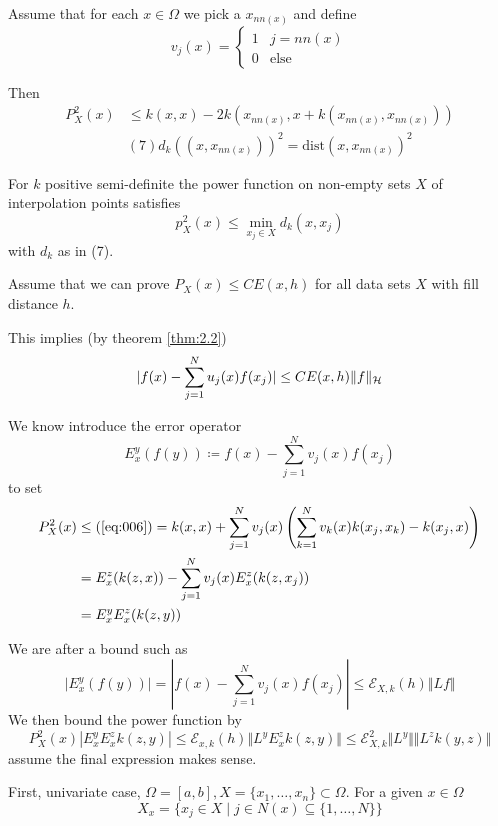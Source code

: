 Assume that for each $x\in\Omega$ we pick a $x_{nn(x)}$ and define 
\[v_j(x)=\begin{cases}
    1 & j=nn(x)\\
    0 & \text{else}
\end{cases}\]

Then 
\begin{align*}
    P_X^2(x)&\leq k(x,x)-2k(x_{nn(x)},x+k(x_{nn(x)},x_{nn(x)}))\\
    &\stackrel{}{(7)}d_k((x,x_{nn(x)}))^2=\text{dist}(x,x_{nn(x)})^2
\end{align*}

\begin{theorem}\label{thm2.8}
    For $k$ positive semi-definite the power function on 
    non-empty sets $X$ of interpolation points satisfies 
    \[p_X^2(x)\leq \min_{x_j\in X} d_k(x,x_j)\] 
    with $d_k$ as in (7). %
\end{theorem}


Assume that we can prove $P_X(x)\leq CE(x,h)$ for all 
data sets $X$ with fill distance $h$.

This implies (by theorem \ref{thm:2.2})
\begin{align*}
    |f(x)-\sum_{j=1}^N u_j(x)f(x_j)|\leq CE(x,h)\Vert f\Vert_{\mathcal{H}}
\end{align*}


We know introduce the error operator 
\[E_x^y(f(y))\coloneqq f(x)-\sum_{j=1}^Nv_j(x)f(x_j)\]
to set 
\begin{align*}
    P_X^2(x)&\leq (\ref{eq:006})=k(x,x)+\sum_{j=1}^N v_j(x)\left(\sum_{k=1}^{N}v_k(x)k(x_j,x_k)-k(x_j,x)\right)\\
    &=E_x^z(k(z,x))-\sum_{j=1}^N v_j(x)E_x^z(k(z,x_j))\\
    &=E_x^yE_x^z(k(z,y))
\end{align*}

We are after a bound such as 
\[\vert E_x^y(f(y))\vert =\left\vert f(x)-\sum_{j=1}^N v_j(x)f(x_j) \right\vert\leq \mathcal{E}_{X,k}(h)\Vert L f\Vert \]
We then bound the power function by 
\[P_X^2(x)\left\vert E_x^yE_x^z k(z,y) \right\vert\leq \mathcal{E}_{x,k}(h)\Vert L^y E_x^z k(z,y)\Vert\leq \mathcal{E}_{X,k}^2\Vert L^y\Vert \Vert L^z k(y,z)\Vert \]
assume the final expression makes sense.



First, univariate case, $\Omega=[a,b], X=\{x_1,\dots,x_n\}\subset\Omega$. For a 
given $x\in\Omega$
\[X_x=\{x_j\in X\mid j\in N(x)\subseteq \{1,\dots,N\}\}\]

